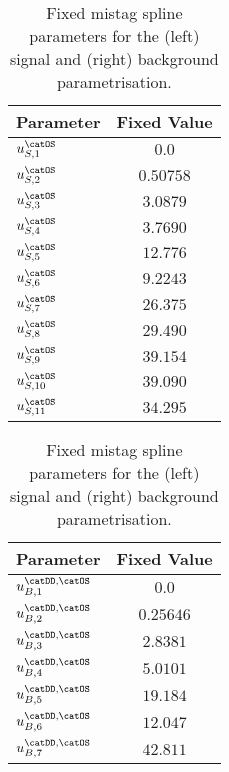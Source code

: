 \begin{table}[h]
\caption{Fixed \OS mistag spline parameters for the (left) signal and (right)
background parametrisation.}
\label{tab:app:measurement_of_sin2beta:cpv_measurement:fixed_parameters:eta:os}
\centering
\begin{tabular}[t]{lr@{$\,\pm\,$}l}
  \toprule
  Parameter                & \multicolumn{2}{c}{Fixed Value} \\
  \midrule
  $u_{S,1}^\text{\catOS}$  & \multicolumn{2}{c}{$0.0$}\\
  $u_{S,2}^\text{\catOS}$  & \multicolumn{2}{c}{$0.50758$}\\
  $u_{S,3}^\text{\catOS}$  & \multicolumn{2}{c}{$3.0879$}\\
  $u_{S,4}^\text{\catOS}$  & \multicolumn{2}{c}{$3.7690$}\\
  $u_{S,5}^\text{\catOS}$  & \multicolumn{2}{c}{$12.776$}\\
  $u_{S,6}^\text{\catOS}$  & \multicolumn{2}{c}{$9.2243$}\\
  $u_{S,7}^\text{\catOS}$  & \multicolumn{2}{c}{$26.375$}\\
  $u_{S,8}^\text{\catOS}$  & \multicolumn{2}{c}{$29.490$}\\
  $u_{S,9}^\text{\catOS}$  & \multicolumn{2}{c}{$39.154$}\\
  $u_{S,10}^\text{\catOS}$ & \multicolumn{2}{c}{$39.090$}\\
  $u_{S,11}^\text{\catOS}$ & \multicolumn{2}{c}{$34.295$}\\
  \bottomrule
\end{tabular}
%
\qquad
%
\begin{tabular}[t]{lr@{$\,\pm\,$}l}
  \toprule
  Parameter                           & \multicolumn{2}{c}{Fixed Value} \\
  \midrule
    $u_{B,1}^\text{\catDD,\catOS}$    & \multicolumn{2}{c}{$0.0$}\\
    $u_{B,2}^\text{\catDD,\catOS}$    & \multicolumn{2}{c}{$0.25646$}\\
    $u_{B,3}^\text{\catDD,\catOS}$    & \multicolumn{2}{c}{$2.8381$}\\
    $u_{B,4}^\text{\catDD,\catOS}$    & \multicolumn{2}{c}{$5.0101$}\\
    $u_{B,5}^\text{\catDD,\catOS}$    & \multicolumn{2}{c}{$19.184$}\\
    $u_{B,6}^\text{\catDD,\catOS}$    & \multicolumn{2}{c}{$12.047$}\\
    $u_{B,7}^\text{\catDD,\catOS}$    & \multicolumn{2}{c}{$42.811$}\\

\end{tabular}
\end{table}
